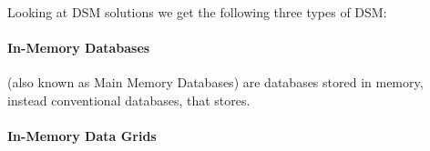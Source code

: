 Looking at DSM solutions we get the following three types of DSM:

\paragraph{In-Memory Databases} (also known as Main Memory Databases) are databases stored in memory, instead conventional databases, that stores.  \cite{garcia1992main}

\paragraph{In-Memory Data Grids}









